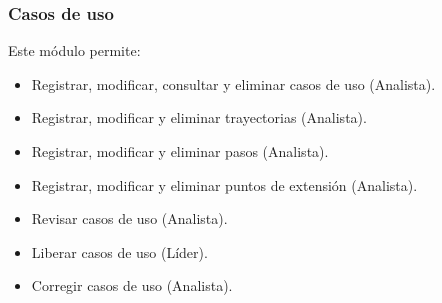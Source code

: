 \subsubsection{Casos de uso}
	Este módulo permite:
	\begin{itemize}
		\item Registrar, modificar, consultar y eliminar casos de uso (Analista).
		\item Registrar, modificar y eliminar trayectorias (Analista).
		\item Registrar, modificar y eliminar pasos (Analista).
		\item Registrar, modificar y eliminar puntos de extensión (Analista).
		\item Revisar casos de uso (Analista).
		\item Liberar casos de uso (Líder).
		\item Corregir casos de uso (Analista).	
	\end{itemize}